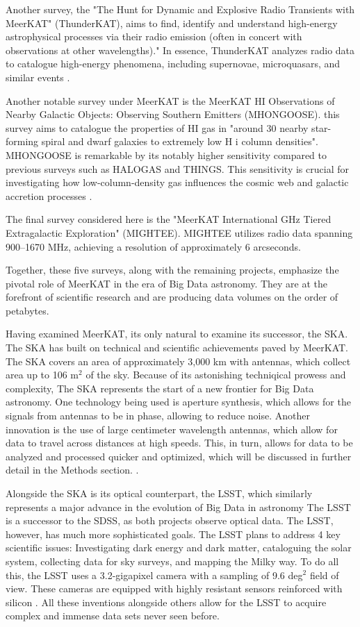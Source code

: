 \documentclass[preprint,linenumbers, longauthor]{aastex631}
\begin{document}
Another survey, the "The Hunt for Dynamic and Explosive Radio Transients with MeerKAT" (ThunderKAT), aims to find, identify and understand high-energy astrophysical processes via their radio emission (often in concert with observations at other wavelengths)." 
In essence, ThunderKAT analyzes radio data to catalogue high-energy phenomena, including supernovae, microquasars, and similar events \cite{woudtThunderKATMeerKATLarge2018}.

Another notable survey under MeerKAT is the MeerKAT HI Observations of Nearby Galactic Objects: Observing Southern Emitters (MHONGOOSE). this survey aims to catalogue the properties of HI gas in "around 30 nearby star-forming spiral and dwarf galaxies to extremely low H i column densities". 
MHONGOOSE is remarkable by its notably higher sensitivity compared to previous surveys such as HALOGAS and THINGS. This sensitivity is crucial for investigating how low-column-density gas influences the cosmic web and galactic accretion processes \cite{deblokMHONGOOSEMeerKATNearby2024}.

The final survey considered here is the "MeerKAT International GHz Tiered Extragalactic Exploration" (MIGHTEE). MIGHTEE utilizes radio data spanning 900–1670 MHz, achieving a resolution of approximately 6 arcseconds.

Together, these five surveys, along with the remaining projects, emphasize the pivotal role of MeerKAT in the era of Big Data astronomy. They are at the forefront of scientific research and are producing data volumes on the order of petabytes.

Having examined MeerKAT, its only natural to examine its successor, the SKA. The SKA has built on technical and scientific achievements paved by MeerKAT.
The SKA covers an area of approximately 3,000 km with antennas, which collect area up to 106 m$^2$ of the sky. Because of its astonishing techniqical prowess and complexity, The SKA represents the start of a new frontier for Big Data astronomy.
One technology being used is aperture synthesis, which allows for the signals from antennas to be in phase, allowing to reduce noise. Another innovation is the use of large centimeter wavelength antennas, which allow for data to travel across distances at high speeds. This, in turn, allows for data to be analyzed and processed quicker and optimized, which will be discussed in further detail in the Methods section. \cite{dewdneySquareKilometreArray2009}.

Alongside the SKA is its optical counterpart, the LSST, which similarly represents a major advance in the evolution of Big Data in astronomy
The LSST is a successor to the SDSS, as both projects observe optical data. The LSST, however, has much more sophisticated goals. The LSST plans to address 4 key scientific issues: Investigating dark energy and dark matter, cataloguing the solar system, collecting data for sky surveys, and mapping the Milky way.
To do all this, the LSST uses a 3.2-gigapixel camera with a sampling of 9.6 deg$^2$ field of view. These cameras are equipped with highly resistant sensors reinforced with silicon \cite{ivezicLSSTScienceDrivers2019}. All these inventions alongside others allow for the LSST to acquire complex and immense data sets never seen before.
\end{document}
